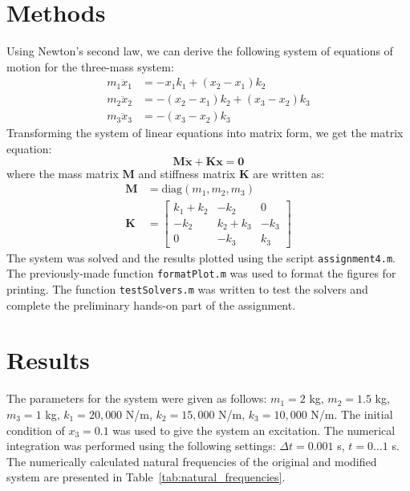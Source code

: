 \documentclass{article}
\begin{document}
	\section*{Methods}
	Using Newton's second law, we can derive the following system of equations of motion for the three-mass system: 
	\begin{equation}
		\begin{aligned}
		m_1 \ddot{x}_1 & = - x_1 k_1 + (x_2 - x_1) k_2 \\
		m_2 \ddot{x}_2 & = - (x_2 - x_1) k_2 + (x_3 - x_2) k_3\\
		m_3 \ddot{x}_3 & = - (x_3 - x_2) k_3
		\end{aligned}
	\end{equation}
	Transforming the system of linear equations into matrix form, we get the matrix equation:
	\begin{equation}
		\mathbf{M} \ddot{\bm{x}} + \mathbf{K} \bm{x} = \bm{0}
	\end{equation}
	where the mass matrix $\mathbf{M}$ and stiffness matrix $\mathbf{K}$ are written as:
	\begin{equation}
		\begin{aligned}
		\mathbf{M} &= \text{diag}(m_1, m_2, m_3) \\
		\mathbf{K} &= \begin{bmatrix}
		k_1 + k_2 & -k_2 & 0 \\
		-k_2 & k_2 + k_3 & - k_3 \\
		0 & -k_3 & k_3
		\end{bmatrix}
		\end{aligned}
	\end{equation}
	The system was solved and the results plotted using the script \texttt{assignment4.m}. The previously-made function \texttt{formatPlot.m} was used to format the figures for printing. The function \texttt{testSolvers.m} was written to test the solvers and complete the preliminary hands-on part of the assignment.
	
	\section*{Results}
	The parameters for the system were given as follows: $m_1 = 2$ kg, $m_2 = 1.5$ kg, $m_3 = 1$ kg, $k_1 = 20,000$ N/m, $k_2 = 15,000$ N/m, $k_3 = 10,000$ N/m. The initial condition of $x_3 = 0.1$ was used to give the system an excitation. The numerical integration was performed using the following settings: $\Delta t = 0.001$ s, $t = 0 \dots 1$ s. The numerically calculated natural frequencies of the original and modified system are presented in Table~\ref*{tab:natural_frequencies}.
	
\end{document}
